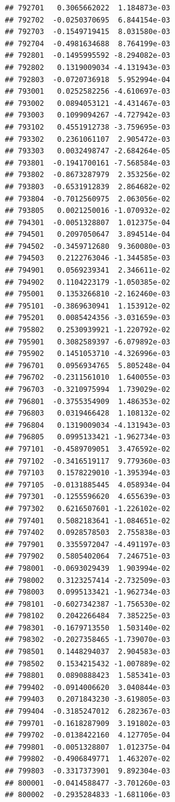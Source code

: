 \documentclass[ignorenonframetext,]{beamer}
\begin{document}
\begin{frame}[fragile]
\begin{verbatim}
## 792701   0.3065662022  1.184873e-03
## 792702  -0.0250370695  6.844154e-03
## 792703  -0.1549719415  8.031580e-03
## 792704  -0.4981634688  8.764199e-03
## 792801  -0.1495995592 -8.294082e-03
## 792802   0.1319009034 -4.131943e-03
## 792803  -0.0720736918  5.952994e-04
## 793001   0.0252582256 -4.610697e-03
## 793002   0.0894053121 -4.431467e-03
## 793003   0.1099094267 -4.727942e-03
## 793102   0.4551912738 -3.759695e-03
## 793302   0.2361061107  2.905472e-03
## 793303   0.0032498747 -2.684264e-05
## 793801  -0.1941700161 -7.568584e-03
## 793802  -0.8673287979  2.353256e-02
## 793803  -0.6531912839  2.864682e-02
## 793804  -0.7012560975  2.063056e-02
## 793805   0.0021250016 -1.070932e-02
## 794301  -0.0051328807  1.012375e-04
## 794501   0.2097050647  3.894514e-04
## 794502  -0.3459712680  9.360080e-03
## 794503   0.2122763046 -1.344585e-03
## 794901   0.0569239341  2.346611e-02
## 794902   0.1104223179 -1.050385e-02
## 795001   0.1353266810 -2.162460e-03
## 795101  -0.3869630941  1.153912e-02
## 795201   0.0085424356 -3.031659e-03
## 795802   0.2530939921 -1.220792e-02
## 795901   0.3082589397 -6.079892e-03
## 795902   0.1451053710 -4.326996e-03
## 796701   0.0956934765  5.805248e-04
## 796702  -0.2311561010  1.640055e-03
## 796703  -0.3210975994  1.739029e-02
## 796801  -0.3755354909  1.486353e-02
## 796803   0.0319466428  1.108132e-02
## 796804   0.1319009034 -4.131943e-03
## 796805   0.0995133421 -1.962734e-03
## 797101  -0.4589709051  3.476592e-02
## 797102  -0.3416519117  9.779360e-03
## 797103   0.1578229010 -1.395394e-03
## 797105  -0.0131885445  4.058934e-04
## 797301  -0.1255596620  4.655639e-03
## 797302   0.6216507601 -1.226102e-02
## 797401   0.5082183641 -1.084651e-02
## 797402   0.0928578503  2.755838e-03
## 797901   0.3355972047 -4.491197e-03
## 797902   0.5805402064  7.246751e-03
## 798001  -0.0693029439  1.903994e-02
## 798002   0.3123257414 -2.732509e-03
## 798003   0.0995133421 -1.962734e-03
## 798101  -0.6027342387 -1.756530e-02
## 798102   0.2042266484  7.385225e-03
## 798301  -0.1679713550  1.503140e-02
## 798302  -0.2027358465 -1.739070e-03
## 798501   0.1448294037  2.904583e-03
## 798502   0.1534215432 -1.007889e-02
## 798801   0.0890888423  1.585341e-03
## 799402  -0.0914006620  3.040844e-03
## 799403   0.2071843230 -3.619805e-03
## 799404  -0.3185247012  6.282367e-03
## 799701  -0.1618287909  3.191802e-03
## 799702  -0.0138422160  4.127705e-04
## 799801  -0.0051328807  1.012375e-04
## 799802  -0.4906849771  1.463207e-02
## 799803  -0.3317373901  9.892304e-03
## 800001  -0.0414588477 -3.701260e-03
## 800002  -0.2935284833 -1.681106e-03

\end{verbatim}
\end{frame}
\end{document}
